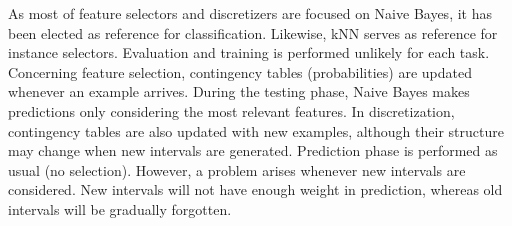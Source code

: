\documentclass[preprint,12pt]{elsarticle}
\begin{document}
\begin{table}[!htp]
\renewcommand{\arraystretch}{1.3}
\centering
\scriptsize
\caption{Parameters of methods}
\label{tab:parameters}
\end{table}

As most of feature selectors and discretizers are focused on Naive Bayes, it has been elected as reference for classification. Likewise, kNN serves as reference for instance selectors. Evaluation and training is performed unlikely for each task. Concerning feature selection, contingency tables (probabilities) are updated whenever an example arrives. During the testing phase, Naive Bayes makes predictions only considering the most relevant features. In discretization, contingency tables are also updated with new examples, although their structure may change when new intervals are generated. Prediction phase is performed as usual (no selection). However, a problem arises whenever new intervals are considered. New intervals will not have enough weight in prediction, whereas old intervals will be gradually forgotten.
\end{document}

